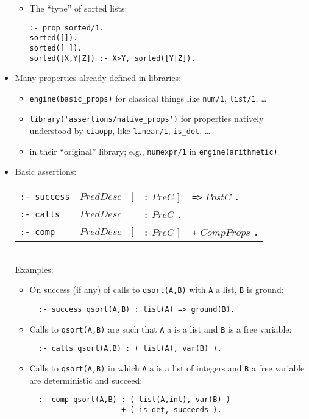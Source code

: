 \documentclass{article}
\renewcommand{\_}{\char'137}
\begin{document}
\begin{itemize}
\begin{itemize}
   \item The ``type'' of sorted lists:
\begin{verbatim}
:- prop sorted/1.
sorted([]).
sorted([_]).
sorted([X,Y|Z]) :- X>Y, sorted([Y|Z]).
\end{verbatim}
\end{itemize}

\item Many properties already defined in libraries:
\begin{itemize}
\item \verb+engine(basic_props)+ for classical things like
  \verb+num/1+, \verb+list/1+, \ldots
\item \verb+library('assertions/native_props')+ for properties
  natively understood by {\tt ciaopp}, like \verb+linear/1+,
  \verb+is_det+, \ldots
\item in their ``original'' library; e.g., \verb+numexpr/1+ in
  \verb+engine(arithmetic)+. 
\end{itemize}

\item Basic assertions:

\begin{tabular}{|lllll|}
\hline
{\tt :- success} & $PredDesc$ & $[$ & {\tt :} $PreC$ $]$  & {\tt =>} $PostC$ {\tt .}\\
{\tt :- calls}   & $PredDesc$ &     & {\tt :} $PreC$ {\tt .} & \\

{\tt :- comp}    & $PredDesc$ & $[$ & {\tt :} $PreC$ $]$  & {\tt +} $CompProps$ {\tt .}\\ [2mm]
\hline
\end{tabular} \\


Examples:
\begin{itemize}
  \item On success (if any) of calls to \verb+qsort(A,B)+ with \verb+A+ a
  list, \verb+B+ is ground:
\begin{verbatim}
  :- success qsort(A,B) : list(A) => ground(B).
\end{verbatim}
  \item Calls to \verb+qsort(A,B)+ are such that \verb+A+ a is a list
  and \verb+B+ is a free variable:
\begin{verbatim}
  :- calls qsort(A,B) : ( list(A), var(B) ).
\end{verbatim}
  \item Calls to \verb+qsort(A,B)+ in which \verb+A+ a is a list of
  integers and \verb+B+ a free variable are deterministic and succeed:
\begin{verbatim}
  :- comp qsort(A,B) : ( list(A,int), var(B) )
                     + ( is_det, succeeds ).
\end{verbatim}
\end{itemize}


\end{itemize}
\end{document}
